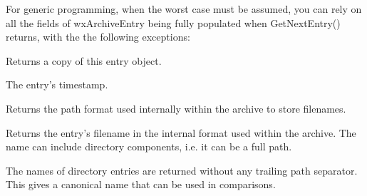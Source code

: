 For generic programming, when the worst case must be assumed, you can
rely on all the fields of wxArchiveEntry being fully populated when
GetNextEntry() returns, with the the following exceptions:

\begin{twocollist}\twocolwidtha{3cm}
\end{twocollist}




\label{wxarchiveentryclone}


Returns a copy of this entry object.


\label{wxarchiveentrydatetime}



The entry's timestamp.


\label{wxarchiveentrygetinternalformat}


Returns the path format used internally within the archive to store
filenames.


\label{wxarchiveentrygetinternalname}


Returns the entry's filename in the internal format used within the
archive. The name can include directory components, i.e. it can be a
full path.

The names of directory entries are returned without any trailing path
separator. This gives a canonical name that can be used in comparisons.




